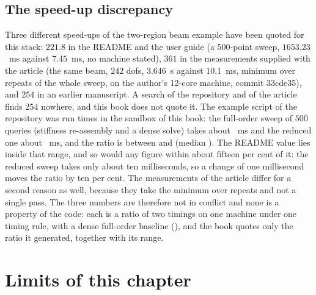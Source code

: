 \subsection{The speed-up discrepancy}\label{sec:vf-speed}
Three different speed-ups of the two-region beam example have been quoted for this stack: $221.8$ in the README and the user guide (a 500-point sweep, $1653.23$~ms against $7.45$~ms, no machine stated), $361$ in the measurements supplied with the article (the same beam, $242$ dofs, $3.646$~s against $10.1$~ms, minimum over repeats of the whole sweep, on the author's 12-core machine, commit 33cde35), and $254$ in an earlier manuscript. A search of the repository and of the article finds $254$ nowhere, and this book does not quote it. The example script of the repository was run \cplRdRuns{} times in the sandbox of this book: the full-order sweep of $500$ queries (stiffness re-assembly and a dense solve) takes about \cplRdFomMs~ms and the reduced one about \cplRdRomMs~ms, and the ratio is between \cplRdMin{} and \cplRdMax{} (median \cplRdMed). The README value lies inside that range, and so would any figure within about fifteen per cent of it: the reduced sweep takes only about ten milliseconds, so a change of one millisecond moves the ratio by ten per cent. The measurements of the article differ for a second reason as well, because they take the minimum over repeats and not a single pass. The three numbers are therefore not in conflict and none is a property of the code: each is a ratio of two timings on one machine under one timing rule, with a dense full-order baseline (), and the book quotes only the ratio it generated, together with its range.

\section{Limits of this chapter}\label{sec:vf-limits}

